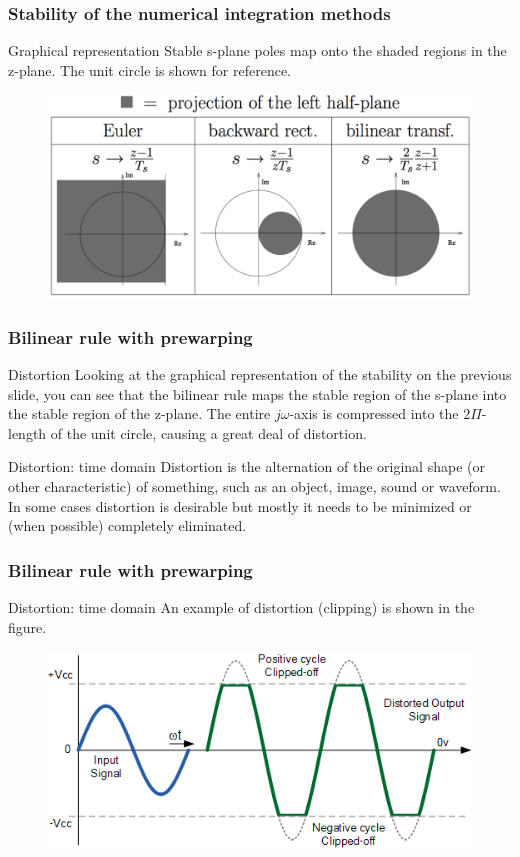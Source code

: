 \begin{frame}
	\frametitle{Stability of the numerical integration methods}
	\begin{block}{Graphical representation}
		Stable s-plane poles map onto the shaded regions in the z-plane. The unit circle is shown for reference.
	\begin{figure}
		\centering
		\includegraphics[width=0.85\linewidth]{Stabiliteit}
	\end{figure}
	\end{block}
\end{frame}


\begin{frame}
	\frametitle{Bilinear rule with prewarping}
	\begin{alertblock}{Distortion}
		Looking at the graphical representation of the stability on the previous slide, you can see that the bilinear rule maps the stable region of the s-plane into the stable region of the z-plane. The entire $j\omega$-axis is compressed into the $2\Pi$-length of the unit circle, causing a great deal of distortion.
	\end{alertblock}
	\begin{block}{Distortion: time domain}
		Distortion is the alternation of the original shape (or other characteristic) of something, such as an object, image, sound or waveform. In some cases distortion is desirable but mostly it needs to be minimized or (when possible) completely eliminated.
	\end{block}
\end{frame}

\begin{frame}
	\frametitle{Bilinear rule with prewarping}
	\begin{block}{Distortion: time domain}
		An example of distortion (clipping) is shown in the figure.
		\begin{figure}
			\centering
			\includegraphics[width=1\linewidth]{Distortion}
		\end{figure}
	\end{block}
\end{frame}


